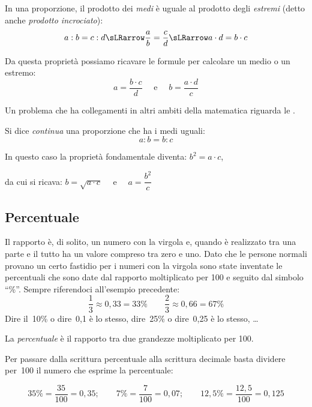 \begin{teorema}{}{}
 In una proporzione, il prodotto dei \emph{medi} è uguale al prodotto 
degli \emph{estremi} (detto anche \emph{prodotto incrociato}):
\[a:b=c:d \sLRarrow \dfrac{a}{b} = \dfrac{c}{d} \sLRarrow 
a \cdot d = b \cdot c\]
\end{teorema}

Da questa proprietà possiamo ricavare le formule per calcolare un medio o 
un estremo:
\[a = \frac{b \cdot c}{d} \quad \text{ e } \quad 
  b = \frac{a \cdot d}{c}\]

Un problema che ha collegamenti in altri ambiti della matematica riguarda 
le .

\begin{definizione}{}{}
 Si dice \emph{continua} una proporzione che ha i medi uguali:
 \[a : b = b : c\]
\end{definizione}

In questo caso la proprietà fondamentale diventa: \qquad
\(b^2 = a \cdot c\),

da cui si ricava: \qquad
\(b = \sqrt{a \cdot c} \quad \text{ e } \quad a = \dfrac{b^2}{c}\)

\subsection{Percentuale}

Il rapporto è, di solito, un numero con la virgola e, 
quando è realizzato tra una parte e il tutto ha un valore compreso tra 
zero e uno. 
Dato che le persone normali provano un certo fastidio per i numeri con la 
virgola sono state inventate le percentuali che sono date dal rapporto 
moltiplicato per 100 e seguito dal simbolo ``\%''. 
Sempre riferendoci all'esempio precedente:
\[\frac{1}{3} \approx 0,33 = 33\% \qquad 
  \frac{2}{3} \approx 0,66 = 67\%\]
Dire il~10\% o dire~0,1 è lo stesso, 
dire~25\% o dire~0,25 è lo stesso, \dots

\begin{definizione}{}{}
 La \emph{percentuale} è il rapporto tra due grandezze moltiplicato per 
100.
\end{definizione}


Per passare dalla scrittura percentuale alla scrittura decimale basta 
dividere per~100 il numero che esprime la percentuale:

\vspace{-.5em}
\[35\% = \frac{35}{100} = 0,35;\qquad
  7\% = \frac{7}{100} = 0,07; \qquad 
12,5\% = \frac{12,5}{100} = 0,125\]

